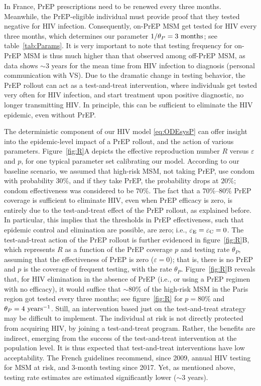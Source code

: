 \documentclass[12pt]{article}
\begin{document}
In France, PrEP prescriptions need to be renewed every three months.\cite{CNSANRS2018} Meanwhile, the PrEP-eligible individual must provide proof that they tested negative for HIV infection. Consequently, on-PrEP MSM get tested for HIV every three months, which determines our parameter $1/\theta_P=3~{\rm months}$; see table~\ref{tab:Params}. It is very important to note that {testing frequency for on-PrEP MSM is thus much higher than that observed among off-PrEP MSM, as data shows $\sim3$ years for the mean time from HIV infection to diagnosis (personal communication with VS)}. Due to the dramatic change in testing behavior, the PrEP rollout can act as a test-and-treat intervention, where individuals get tested very often for HIV infection, and start treatment upon positive diagnostic, no longer transmitting HIV. In principle, this can be sufficient to eliminate the HIV epidemic, even without PrEP. \cite{Kretzschmar2013,WHO2016} 

The deterministic component of our HIV model \eqref{eq:ODEsysP} can offer insight into the epidemic-level impact of a PrEP rollout, and the action of various parameters. Figure~\ref{fig:R}A depicts the effective reproduction number $R$ versus $\varepsilon$ and $p$, for one typical parameter set calibrating our model.  According to our baseline scenario, we assumed that high-risk MSM, not taking PrEP, use condom with probability $30\%$, and if they take PrEP, the probability drops at $20\%$; condom effectiveness was considered to be $70\%$. The fact that a $70\%$--$80\%$ PrEP coverage is sufficient to eliminate HIV, even when PrEP efficacy is zero, is entirely due to the test-and-treat effect of the PrEP rollout, as explained before. In particular, this implies that the thresholds in PrEP effectiveness, such that epidemic control and elimination are possible, are zero; i.e., $\varepsilon_{\rm E} = \varepsilon_{\rm C} = 0$. The test-and-treat action of the PrEP rollout is further evidenced in figure~\ref{fig:R}B, which represents $R$ as a function of the PrEP coverage $p$ and testing rate $\theta_P$, assuming that the effectiveness of PrEP is zero ($\varepsilon=0$); that is, there is no PrEP and $p$ is the coverage of frequent testing, with the rate $\theta_P$. Figure~\ref{fig:R}B reveals that, for HIV elimination in the absence of PrEP (i.e., or using a PrEP regimen with no efficacy), it would suffice that $\sim 80\%$ of the high-risk MSM in the Paris region got tested every three months; see figure~\ref{fig:R} for $p=80\%$ and $\theta_P=4~\rm{years^{-1}}$. Still, an intervention based just on the test-and-treat strategy may be difficult to implement. The individual at risk is not directly protected from acquiring HIV, by joining a test-and-treat program. Rather, the benefits are indirect, emerging from the success of the test-and-treat intervention at the population level. It is thus expected that test-and-treat interventions have low acceptability. The French guidelines recommend, since 2009, annual HIV testing for MSM at risk, and 3-month testing since 2017. {Yet, as mentioned above, testing rate estimates are estimated significantly lower ($\sim3$ years).}
\end{document}
